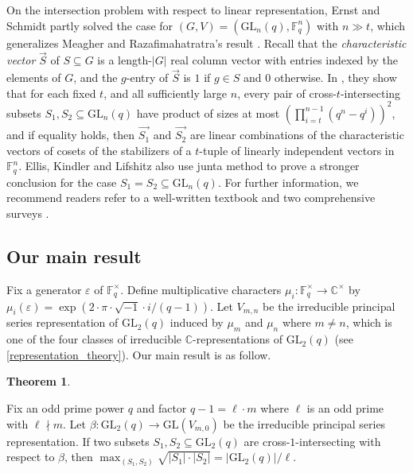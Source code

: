 \documentclass[12pt, reqno]{amsart}
\theoremstyle{definition}
\newtheorem{theorem}{Theorem}[section]
\theoremstyle{remark}
\numberwithin{equation}{section}
\newcommand{\BC}{\mathbb{C}}
\newcommand{\BF}{\mathbb{F}}
\newcommand{\pt}[1]{\left(#1\right)}
\newcommand{\abs}[1]{\left|#1\right|}
\newcommand{\GL}{\mathrm{GL}}
\begin{document}
On the intersection problem with respect to linear representation, Ernst and Schmidt \cite{MR4600198} partly solved the case for $(G, V) = (\GL_n(q), \BF_q^n)$ with $n \gg t$, which generalizes Meagher and Razafimahatratra's result \cite{MR4521814}. Recall that the \emph{characteristic vector} $\overrightarrow{S}$ of $S \subseteq G$ is a length-$\abs{G}$ real column vector with entries indexed by the elements of $G$, and the $g$-entry of $\overrightarrow{S}$ is $1$ if $g \in S$ and $0$ otherwise. In \cite{MR4600198}, they show that for each fixed $t$, and all sufficiently large $n$, every pair of cross-$t$-intersecting subsets $S_1, S_2 \subseteq \GL_n(q)$ have product of sizes at most $\pt{\prod_{i = t}^{n - 1}\pt{q^n - q^i}}^2$, and if equality holds, then $\overrightarrow{S_1}$ and $\overrightarrow{S_2}$ are linear combinations of the characteristic vectors of cosets of the stabilizers of a $t$-tuple of linearly independent vectors in $\BF_q^n$. Ellis, Kindler and Lifshitz \cite{MR4684861} also use junta method to prove a stronger conclusion for the case $S_1 = S_2 \subseteq \GL_n(q)$. For further  information, we recommend readers refer to a well-written textbook \cite{MR3497070} and two comprehensive surveys \cite{MR4421401, MR3534067}.

\subsection{Our main result}

Fix a generator $\varepsilon$ of $\BF_q^\times$. Define multiplicative characters $\mu_i: \BF_q^\times \rightarrow \BC^\times$ by $\mu_i(\varepsilon) = \exp\pt{2\cdot\pi\cdot\sqrt{-1}\cdot i/(q - 1)}$. Let $V_{m, n}$ be the irreducible principal series representation of $\GL_2(q)$ induced by $\mu_m$ and $\mu_n$ where $m \ne n$, which is one of the four classes of irreducible $\BC$-representations of $\GL_2(q)$ (see \ref{representation_theory}). Our main result is as follow.

\begin{theorem}\label{main_thm}
	
	Fix an odd prime power $q$ and factor $q - 1 = \ell \cdot m$ where $\ell$ is an odd prime with $\ell \nmid m$. Let $\beta: \GL_2(q) \rightarrow \GL(V_{m, 0})$ be the irreducible principal series representation. If two subsets $S_1, S_2 \subseteq \GL_2(q)$ are cross-$1$-intersecting with respect to $\beta$, then $\max_{(S_1, S_2)}\sqrt{\abs{S_1}\cdot\abs{S_2}} = \abs{\GL_2(q)}/\ell$.	
	
\end{theorem}
\end{document}

